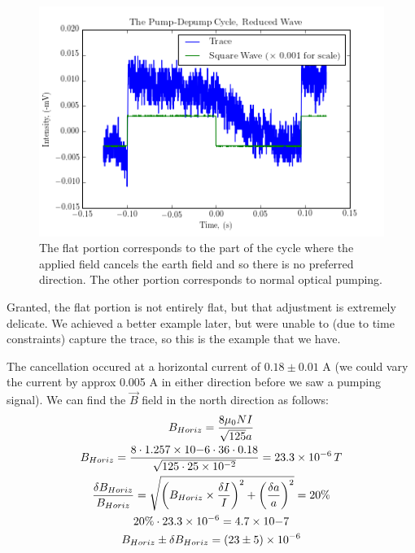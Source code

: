 \documentclass{article}
\DeclarePairedDelimiter{\parens}{\lparen}{\rparen}
\begin{document}
    \hspace{.25cm}

    \begin{figure}[!htb]
      \centering
      \includegraphics[scale=.75]{../plots/reduced_wave.png}
      \caption{The flat portion corresponds to the part of the cycle where the applied field cancels the earth field and so there is no preferred direction.  The other portion corresponds to normal optical pumping.}
      \label{reduced}
    \end{figure}

    Granted, the flat portion is not entirely flat, but that adjustment is extremely delicate.  We achieved a better example later, but were unable to (due to time constraints) capture the trace, so this is the example that we have.

    \hspace{.25cm}

    The cancellation occured at a horizontal current of $0.18 \pm 0.01$ A (we could vary the current by approx 0.005 A in either direction before we saw a pumping signal).  We can find the $\vec{B}$ field in the north direction as follows:
    \begin{gather*}
      B_{Horiz} = \frac{8 \mu_0 N I}{\sqrt{125} a} \\
      B_{Horiz} = \frac{8 \cdot 1.257\times10{-6} \cdot 36 \cdot 0.18}{\sqrt{125 \cdot 25\times10^{-2}}} = 23.3\times10^{-6} \, T \\
      \frac{\delta B_{Horiz}}{B_{Horiz}} = \sqrt{\parens*{B_{Horiz}\times\frac{\delta I}{I}}^2 + \parens*{\frac{\delta a}{a}}^2} = 20\% \\
      20\%\cdot 23.3\times10^{-6} = 4.7\times10{-7} \\
      B_{Horiz} \pm \delta B_{Horiz} = (23 \pm 5) \times 10^{-6}
    \end{gather*}
\end{document}
